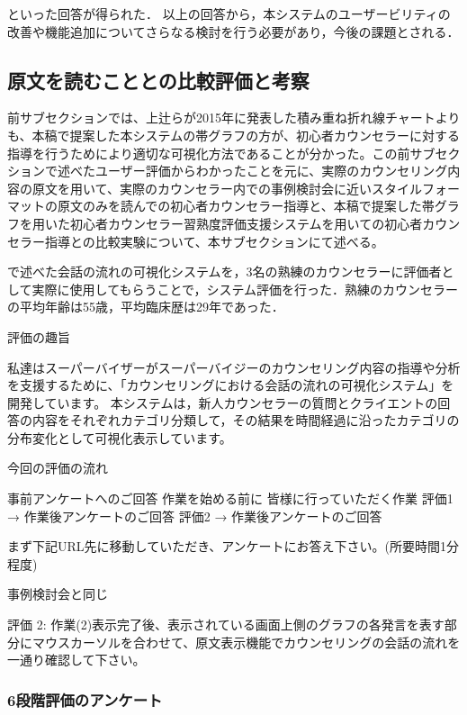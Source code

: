 \documentclass[shuuron]{kuee}
\begin{document}

といった回答が得られた．
以上の回答から，本システムのユーザービリティの　改善や機能追加についてさらなる検討を行う必要があり，今後の課題とされる．

\subsection{原文を読むこととの比較評価と考察}




前サブセクションでは、上辻らが2015年に発表した積み重ね折れ線チャートよりも、本稿で提案した本システムの帯グラフの方が、初心者カウンセラーに対する指導を行うためにより適切な可視化方法であることが分かった。この前サブセクションで述べたユーザー評価からわかったことを元に、実際のカウンセリング内容の原文を用いて、実際のカウンセラー内での事例検討会に近いスタイルフォーマットの原文のみを読んでの初心者カウンセラー指導と、本稿で提案した帯グラフを用いた初心者カウンセラー習熟度評価支援システムを用いての初心者カウンセラー指導との比較実験について、本サブセクションにて述べる。

で述べた会話の流れの可視化システムを，3名の熟練のカウンセラーに評価者として実際に使用してもらうことで，システム評価を行った．熟練のカウンセラーの平均年齢は55歳，平均臨床歴は29年であった．

評価の趣旨

私達はスーパーバイザーがスーパーバイジーのカウンセリング内容の指導や分析を支援するために、「カウンセリングにおける会話の流れの可視化システム」を開発しています。
本システムは，新人カウンセラーの質問とクライエントの回答の内容をそれぞれカテゴリ分類して，その結果を時間経過に沿ったカテゴリの分布変化として可視化表示しています。

今回の評価の流れ

事前アンケートへのご回答
作業を始める前に
皆様に行っていただく作業
評価1 → 作業後アンケートのご回答
評価2 → 作業後アンケートのご回答


まず下記URL先に移動していただき、アンケートにお答え下さい。(所要時間1分程度)


事例検討会と同じ

評価 2: 作業(2)表示完了後、表示されている画面上側のグラフの各発言を表す部分にマウスカーソルを合わせて、原文表示機能でカウンセリングの会話の流れを一通り確認して下さい。

\subsubsection{6段階評価のアンケート}
\end{document}
